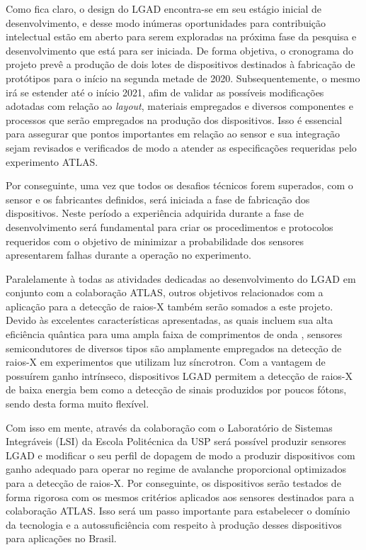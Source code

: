 Como fica claro, o design do LGAD encontra-se em seu estágio inicial de desenvolvimento, e desse modo inúmeras oportunidades para contribuição intelectual estão em aberto para serem exploradas na próxima fase da pesquisa e desenvolvimento que está para ser iniciada. De forma objetiva, o cronograma do projeto prevê a produção de dois lotes de dispositivos destinados à fabricação de protótipos para o início na segunda metade de 2020. Subsequentemente, o mesmo irá se estender até o início 2021, afim de validar as possíveis modificações adotadas com relação ao {\it layout}, materiais empregados e diversos componentes e processos que serão empregados na produção dos dispositivos. Isso é essencial para assegurar que pontos importantes em relação ao sensor e sua integração sejam revisados e verificados de modo a atender as especificações requeridas pelo experimento ATLAS.

Por conseguinte, uma vez que todos os desafios técnicos forem superados, com o sensor e os fabricantes definidos, será iniciada a fase de fabricação dos dispositivos. Neste período a experiência adquirida durante a fase de desenvolvimento será fundamental para criar os procedimentos e protocolos requeridos com o objetivo de minimizar a probabilidade dos sensores apresentarem falhas durante a operação no experimento. %

Paralelamente à todas as atividades dedicadas ao desenvolvimento do LGAD em conjunto com a colaboração ATLAS, outros objetivos relacionados com a aplicação para a detecção de raios-X também serão somados a este projeto. Devido às excelentes características apresentadas, as quais incluem sua alta eficiência quântica para uma ampla faixa de comprimentos de onda \cite{book1,book2}, sensores semicondutores de diversos tipos são amplamente empregados na detecção de raios-X em experimentos que utilizam luz síncrotron. Com a vantagem de possuírem ganho intrínseco, dispositivos LGAD permitem a detecção de raios-X de baixa energia bem como a detecção de sinais produzidos por poucos fótons, sendo desta forma muito flexível. 

Com isso em mente, através da colaboração com o Laboratório de Sistemas Integráveis (LSI) da Escola Politécnica da USP será possível produzir sensores LGAD e modificar o seu perfil de dopagem de modo a produzir dispositivos com ganho adequado para operar no regime de avalanche proporcional optimizados para a detecção de raios-X. Por conseguinte, os dispositivos serão testados de forma rigorosa com os mesmos critérios aplicados aos sensores destinados para a colaboração ATLAS. Isso será um passo importante para estabelecer o domínio da tecnologia e a autossuficiência com respeito à produção desses dispositivos para aplicações no Brasil.

